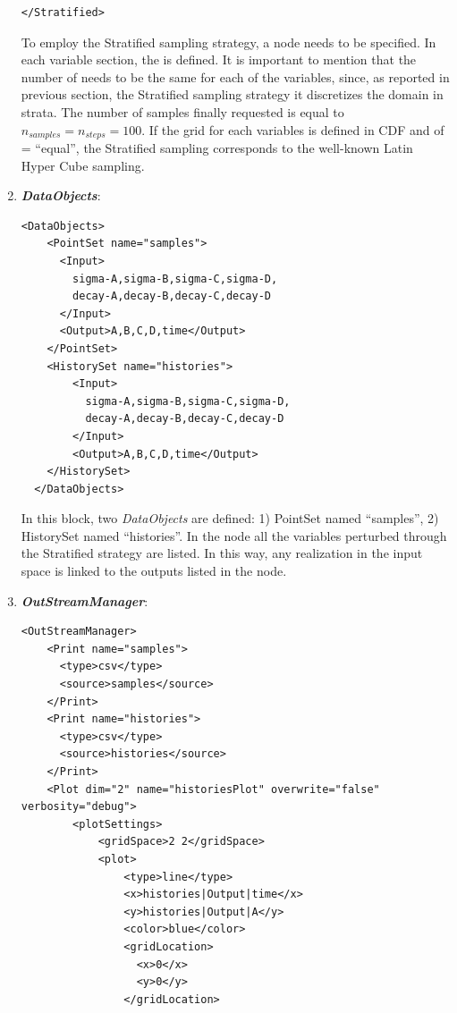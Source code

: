 \begin{enumerate}
\begin{lstlisting}[style=XML,morekeywords={arg,extension,pauseAtEnd,overwrite}]
    </Stratified> 
\end{lstlisting}
  To employ the Stratified sampling strategy, a 
   node needs to be specified. In each variable section, the   is defined. 
  It is important to mention that the number of  needs to be the same for each of the variables,
  since, as reported in previous section, the Stratified sampling strategy it discretizes the domain in strata. 
  The number of samples finally requested is equal to $n_{samples} = n_{steps} = 100$.
  If the grid for each variables is defined in CDF and of   = ``equal'', the Stratified
  sampling corresponds to the well-known Latin Hyper Cube sampling.
   \item \textbf{\textit{DataObjects}}:
\begin{lstlisting}[style=XML,morekeywords={arg,extension,pauseAtEnd,overwrite}]
  <DataObjects>
    <PointSet name="samples">
      <Input>
        sigma-A,sigma-B,sigma-C,sigma-D,
        decay-A,decay-B,decay-C,decay-D
      </Input>
      <Output>A,B,C,D,time</Output>
    </PointSet>
    <HistorySet name="histories">
        <Input>
          sigma-A,sigma-B,sigma-C,sigma-D,
          decay-A,decay-B,decay-C,decay-D
        </Input>
        <Output>A,B,C,D,time</Output>
    </HistorySet>
  </DataObjects>
\end{lstlisting}
  In this block, two \textit{DataObjects} are defined: 1) PointSet named 
  ``samples'', 2) HistorySet named ``histories''.
  In the  node all the variables 
  perturbed through the Stratified strategy are listed. In this way, any
  realization in the input space is linked to the outputs listed in  the 
   node.
   \item \textbf{\textit{OutStreamManager}}:   
\begin{lstlisting}[style=XML,morekeywords={arg,extension,pauseAtEnd,overwrite}]
  <OutStreamManager>
    <Print name="samples">
      <type>csv</type>
      <source>samples</source>
    </Print>
    <Print name="histories">
      <type>csv</type>
      <source>histories</source>
    </Print>
    <Plot dim="2" name="historiesPlot" overwrite="false" verbosity="debug">
        <plotSettings>
            <gridSpace>2 2</gridSpace>
            <plot>
                <type>line</type>
                <x>histories|Output|time</x>
                <y>histories|Output|A</y>
                <color>blue</color>
                <gridLocation>
                  <x>0</x>
                  <y>0</y>
                </gridLocation>

\end{lstlisting}
\end{enumerate}
